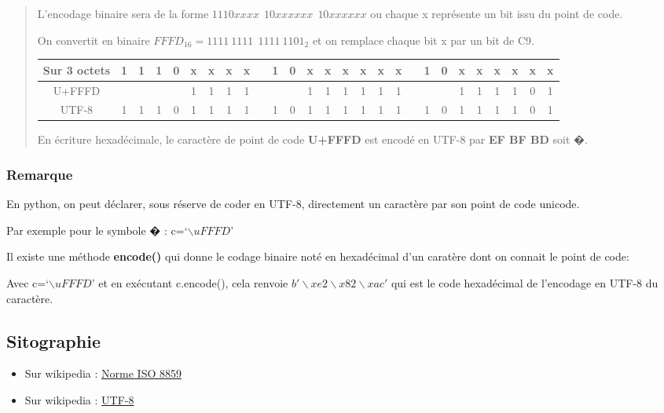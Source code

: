 \documentclass[11pt]{article}
\providecommand{\tightlist}{%
      \setlength{\itemsep}{0pt}\setlength{\parskip}{0pt}}
\begin{document}
\begin{quote}
L'encodage binaire sera de la forme \(1110xxxx~~10xxxxxx~~10xxxxxx\) ou
chaque x représente un bit issu du point de code.

On convertit en binaire \(FFFD_{16} = 1111~1111~~1111~1101_{2}\) et on
remplace chaque bit x par un bit de C9.

\begin{longtable}[]{@{}ccccccccccccccccccccccccccc@{}}
\toprule
Sur 3 octets & 1 & 1 & 1 & 0 & x & x & x & x & & 1 & 0 & x & x & x & x &
x & x & & 1 & 0 & x & x & x & x & x & x\tabularnewline
\midrule
\endhead
U+FFFD & & & & & 1 & 1 & 1 & 1 & & & & 1 & 1 & 1 & 1 & 1 & 1 & & & & 1 &
1 & 1 & 1 & 0 & 1\tabularnewline
UTF-8 & 1 & 1 & 1 & 0 & 1 & 1 & 1 & 1 & & 1 & 0 & 1 & 1 & 1 & 1 & 1 & 1
& & 1 & 0 & 1 & 1 & 1 & 1 & 0 & 1\tabularnewline
\bottomrule
\end{longtable}

En écriture hexadécimale, le caractère de point de code \textbf{U+FFFD}
est encodé en UTF-8 par \textbf{EF BF BD} soit �.
\end{quote}

    \hypertarget{remarque}{%
\subsubsection*{Remarque}\label{remarque}}

En python, on peut déclarer, sous réserve de coder en UTF-8, directement
un caractère par son point de code unicode.

Par exemple pour le symbole � : c=`\(\backslash uFFFD\)'

Il existe une méthode \textbf{encode()} qui donne le codage binaire noté
en hexadécimal d'un caratère dont on connait le point de code:

Avec c=`\(\backslash uFFFD\)' et en exécutant c.encode(), cela renvoie
\(b'\backslash xe2\backslash x82\backslash xac'\) qui est le code
hexadécimal de l'encodage en UTF-8 du caractère.

    \hypertarget{sitographie}{%
\subsection*{Sitographie}\label{sitographie}}

\begin{itemize}
\tightlist
\item
  Sur wikipedia :
  \href{https://fr.wikipedia.org/wiki/ISO/CEI_8859}{Norme ISO 8859}
\item
  Sur wikipedia : \href{https://fr.wikipedia.org/wiki/UTF-8}{UTF-8}
\end{itemize}
\end{document}
